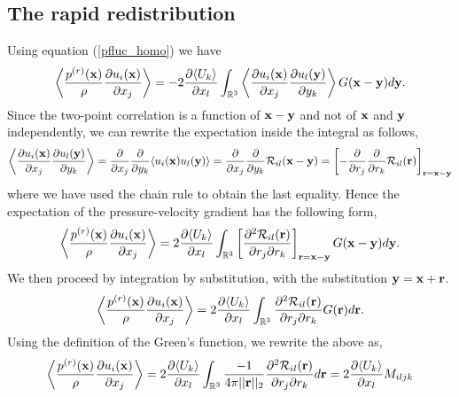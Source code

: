 \documentclass[oneside,a4paper,11pt]{report}
\begin{document}
\subsection{The rapid redistribution}

Using equation (\ref{pfluc_homo}) we have
\begin{equation}
\left \langle \frac{p^{(r)}(\mathbf{x})}{\rho}\frac{\partial u_i(\mathbf{x})}{\partial x_j} \right \rangle= -2\frac{\partial \langle U_k \rangle}{\partial x_l} \int_{\mathbb{R}^3} \left \langle \frac{\partial u_i(\mathbf{x})}{\partial x_j} \frac{\partial u_l(\mathbf{y})}{\partial y_k} \right \rangle G(\mathbf{x}-\mathbf{y}) d\mathbf{y}.
\end{equation}
Since the two-point correlation is a function of $\mathbf{x} - \mathbf{y}$ and not of $\mathbf{x}$ and $\mathbf{y}$ independently, we can rewrite the expectation inside the integral as follows,
\begin{equation}
\left \langle \frac{\partial u_i(\mathbf{x})}{\partial x_j} \frac{\partial u_l(\mathbf{y})}{\partial y_k} \right \rangle = \frac{\partial}{\partial x_j} \frac{\partial}{\partial y_k} \langle u_i(\mathbf{x})u_l(\mathbf{y}) \rangle = \frac{\partial}{\partial x_j} \frac{\partial}{\partial y_k} \mathcal{R}_{il}(\mathbf{x} - \mathbf{y}) = \left [-\frac{\partial}{\partial r_j} \frac{\partial}{\partial r_k} \mathcal{R}_{il}(\mathbf{r}) \right]_{\mathbf{r} = \mathbf{x}-\mathbf{y}}
\end{equation}
where we have used the chain rule to obtain the last equality.
Hence the expectation of the pressure-velocity gradient has the following form,
\begin{equation}
\left \langle \frac{p^{(r)}(\mathbf{x})}{\rho}\frac{\partial u_i(\mathbf{x})}{\partial x_j} \right \rangle= 2\frac{\partial \langle U_k \rangle}{\partial x_l} \int_{\mathbb{R}^3} \left [\frac{\partial^2 \mathcal{R}_{il}(\mathbf{r})}{\partial r_j \partial r_k} \right]_{\mathbf{r} = \mathbf{x}-\mathbf{y}} G(\mathbf{x}-\mathbf{y}) d\mathbf{y}.
\end{equation}
We then proceed by integration by substitution, with the substitution $\mathbf{y} = \mathbf{x} + \mathbf{r}$.
\begin{equation}
\left \langle \frac{p^{(r)}(\mathbf{x})}{\rho}\frac{\partial u_i(\mathbf{x})}{\partial x_j} \right \rangle = 2\frac{\partial \langle U_k \rangle}{\partial x_l} \int_{\mathbb{R}^3}\frac{\partial^2 \mathcal{R}_{il}(\mathbf{r})}{\partial r_j \partial r_k} G(\mathbf{r}) d\mathbf{r}.
\end{equation}
Using the definition of the Green's function, we rewrite the above as,
\begin{equation}
\left \langle \frac{p^{(r)}(\mathbf{x})}{\rho}\frac{\partial u_i(\mathbf{x})}{\partial x_j} \right \rangle = 2 \frac{\partial \langle U_k \rangle}{\partial x_l} \int_{\mathbb{R}^3} \frac{-1}{4\pi||\mathbf{r}||_2} \frac{\partial^2 \mathcal{R}_{il}(\mathbf{r})}{\partial r_j \partial r_k} d\mathbf{r} = 2 \frac{\partial \langle U_k \rangle}{\partial x_l} M_{iljk}
\end{equation}
\end{document}
